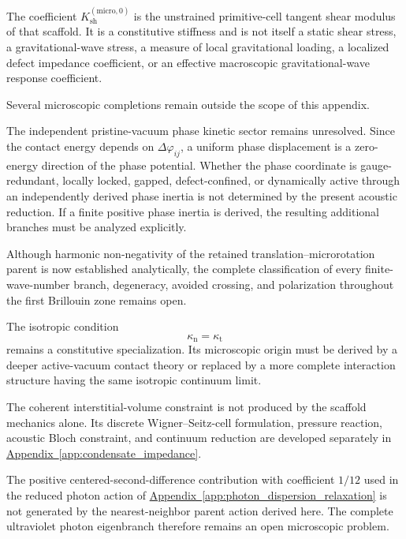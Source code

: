 The coefficient $K_{\mathrm{sh}}^{(\mathrm{micro},0)}$ is the unstrained primitive-cell tangent shear modulus of that scaffold. It is a constitutive stiffness and is not itself a static shear stress, a gravitational-wave stress, a measure of local gravitational loading, a localized defect impedance coefficient, or an effective macroscopic gravitational-wave response coefficient.

Several microscopic completions remain outside the scope of this appendix.

The independent pristine-vacuum phase kinetic sector remains unresolved. Since the contact energy depends on $\Delta\varphi_{ij}$, a uniform phase displacement is a zero-energy direction of the phase potential. Whether the phase coordinate is gauge-redundant, locally locked, gapped, defect-confined, or dynamically active through an independently derived phase inertia is not determined by the present acoustic reduction. If a finite positive phase inertia is derived, the resulting additional branches must be analyzed explicitly.

Although harmonic non-negativity of the retained translation--microrotation parent is now established analytically, the complete classification of every finite-wave-number branch, degeneracy, avoided crossing, and polarization throughout the first Brillouin zone remains open.

The isotropic condition
\begin{equation}
    \kappa_{\mathrm{n}}=\kappa_{\mathrm{t}}
\end{equation}
remains a constitutive specialization. Its microscopic origin must be derived by a deeper active-vacuum contact theory or replaced by a more complete interaction structure having the same isotropic continuum limit.

The coherent interstitial-volume constraint is not produced by the scaffold mechanics alone. Its discrete Wigner--Seitz-cell formulation, pressure reaction, acoustic Bloch constraint, and continuum reduction are developed separately in \hyperref[app:condensate_impedance]{Appendix~\ref*{app:condensate_impedance}}.

The positive centered-second-difference contribution with coefficient $1/12$ used in the reduced photon action of \hyperref[app:photon_dispersion_relaxation]{Appendix~\ref*{app:photon_dispersion_relaxation}} is not generated by the nearest-neighbor parent action derived here. The complete ultraviolet photon eigenbranch therefore remains an open microscopic problem.

